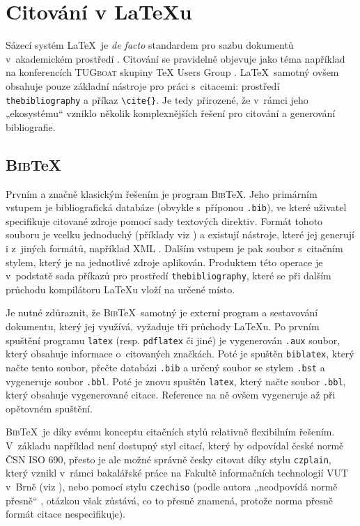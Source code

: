 \documentclass[11pt]{article}
\begin{document}
\section{Citování v \LaTeX u}
Sázecí systém \LaTeX\ je \emph{de facto} standardem pro sazbu dokumentů v~akademickém prostředí \cite{dongen_latex, knauff_latex_ef}. Citování se pravidelně objevuje jako téma například na konferencích \textsc{TUGboat} skupiny TeX Users Group \cite[např.][]{tugboat_29,tugboat_30,tugboat_32}. \LaTeX\ samotný ovšem obsahuje pouze základní nástroje pro práci s~citacemi: prostředí \verb|thebibliography| a příkaz \verb|\cite{}|. Je tedy přirozené, že v~rámci jeho „ekosystému“ vzniklo několik komplexnějších řešení pro citování a generování bibliografie.

\subsection{\textsc{Bib}\TeX}
Prvním a značně klasickým řešením je program \textsc{Bib}\TeX. Jeho primárním vstupem je bibliografická databáze (obvykle s~příponou \verb|.bib|), ve které uživatel specifikuje citované zdroje pomocí sady textových direktiv. Formát tohoto souboru je vcelku jednoduchý (příklady viz \cite[kap.~8]{markey_bibtex}) a existují nástroje, které jej generují i z~jiných formátů, například XML \cite{mazac_xml}. Dalším vstupem je pak soubor s~citačním stylem, který je na jednotlivé zdroje aplikován. Produktem této operace je v~podstatě sada příkazů pro prostředí \verb|thebibliography|, které se při dalším průchodu kompilátoru \LaTeX u vloží na určené místo.

Je nutné zdůraznit, že \textsc{Bib}\TeX\ samotný je externí program a sestavování dokumentu, který jej využívá, vyžaduje tři průchody \LaTeX u. Po prvním spuštění programu \verb|latex| (resp. \verb|pdflatex| či jiné) je vygenerován \verb|.aux| soubor, který obsahuje informace o~citovaných značkách. Poté je spuštěn \verb|biblatex|, který načte tento soubor, přečte databázi \verb|.bib| a určený soubor se stylem \verb|.bst| a vygeneruje soubor \verb|.bbl|. Poté je znovu spuštěn \verb|latex|, který načte soubor \verb|.bbl|, který obsahuje vygenerované citace. Reference na ně ovšem vygeneruje až při opětovném spuštění. \cite[kap.~5]{markey_bibtex}

\textsc{Bib}\TeX\ je díky svému konceptu citačních stylů relativně flexibilním řešením. V~základu například není dostupný styl citací, který by odpovídal české normě ČSN ISO 690, přesto je ale možné správně česky citovat díky stylu \verb|czplain|, který vznikl v~rámci bakalářské práce na Fakultě informačních technologií VUT v~Brně (viz \cite{pysny_czplain}), nebo pomocí stylu \verb|czechiso| (podle autora „neodpovídá normě přesně“ \cite{martinek_czechiso}, otázkou však zůstává, co to přesně znamená, protože norma přesně formát citace nespecifikuje).
\end{document}
